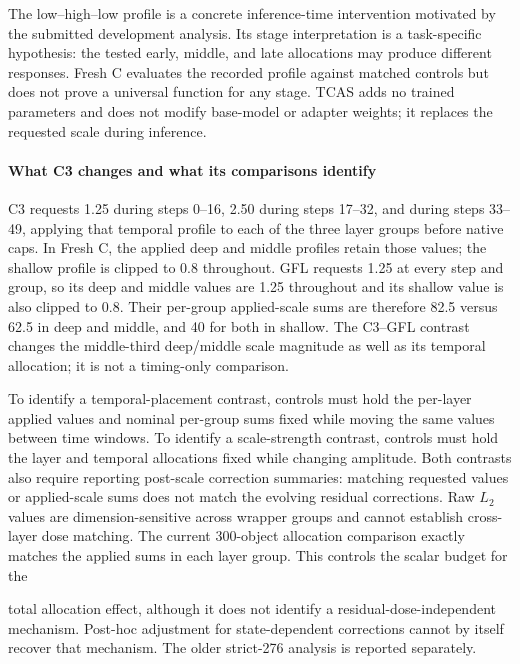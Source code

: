 \documentclass[times,twocolumn,final]{elsarticle}
\providecommand{\DIFadd}[1]{{\protect\color{blue} \sf #1}} %
\providecommand{\DIFaddbegin}{} %
\providecommand{\DIFaddend}{} %
\begin{document}
  \DIFaddbegin \DIFadd{The low--high--low profile is a concrete inference-time intervention motivated by the submitted development analysis. Its stage interpretation is a task-specific hypothesis: the tested early, middle, and late allocations may produce different responses. Fresh C evaluates the recorded profile against matched controls but does not prove a universal function for any stage. TCAS adds no trained }\DIFaddend parameters and does not modify   \DIFaddbegin \DIFadd{base-model }\DIFaddend or adapter weights; it   \DIFaddbegin \DIFadd{replaces the requested scale during inference}\DIFaddend .

  \DIFaddbegin \paragraph{What C3 changes and what its comparisons identify}
\DIFadd{C3 requests 1.25 during steps 0--16, 2.50 during steps 17--32, }\DIFaddend and   \DIFaddbegin \DIFadd{1.25 during steps 33--49, applying that temporal profile to each of the three layer groups before native caps. In Fresh C, the applied deep and middle profiles retain those values; the shallow profile is clipped to 0.8 throughout. GFL requests 1.25 at every step and group, so its deep and middle values are 1.25 throughout and its shallow value is also clipped to 0.8. Their per-group applied-scale sums are therefore 82.5 versus 62.5 in deep and middle, and 40 for both in shallow. The C3--GFL contrast changes the middle-third deep/middle scale magnitude as well as its temporal allocation; it is not a timing-only comparison.
}\DIFaddend 

  \DIFaddbegin \DIFadd{To identify a temporal-placement contrast, controls must hold the per-layer applied values and nominal per-group sums fixed while moving the same values between time windows. To identify a scale-strength contrast, controls must hold the layer and temporal allocations fixed while changing amplitude. Both contrasts also require reporting post-scale correction summaries: matching requested values or applied-scale sums does not match the evolving residual corrections. Raw $L_2$ values are dimension-sensitive across wrapper groups and cannot establish cross-layer dose matching. The current 300-object allocation comparison exactly matches the applied sums in each layer group. This controls the scalar budget for }\DIFaddend the  

 \DIFaddbegin \DIFadd{total allocation effect, although it does not identify a residual-dose-independent mechanism. Post-hoc adjustment for state-dependent corrections cannot by itself recover that mechanism. The older strict-276 analysis is reported separately.
}\DIFaddend 
\end{document}
